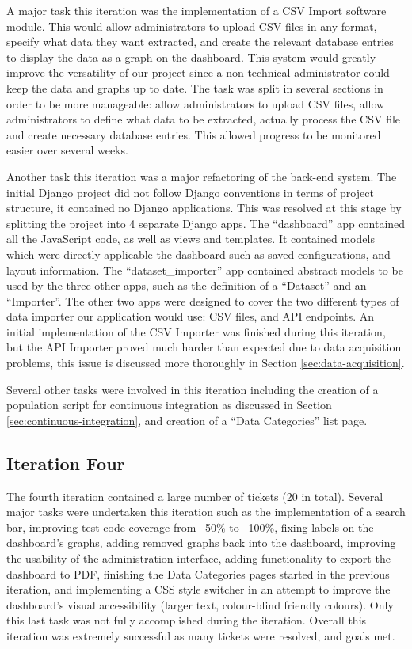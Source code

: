 \documentclass{l3proj}
\begin{document}
A major task this iteration was the implementation of a CSV Import software module. This would allow administrators to upload CSV files in any format, specify what data they want extracted, and create the relevant database entries to display the data as a graph on the dashboard. This system would greatly improve the versatility of our project since a non-technical administrator could keep the data and graphs up to date. The task was split in several sections in order to be more manageable: allow administrators to upload CSV files, allow administrators to define what data to be extracted, actually process the CSV file and create necessary database entries. This allowed progress to be monitored easier over several weeks.

Another task this iteration was a major refactoring of the back-end system. The initial Django project did not follow Django conventions in terms of project structure, it contained no Django applications. This was resolved at this stage by splitting the project into 4 separate Django apps. The ``dashboard'' app contained all the JavaScript code, as well as views and templates. It contained models which were directly applicable the dashboard such as saved configurations, and layout information. The ``dataset\_importer'' app contained abstract models to be used by the three other apps, such as the definition of a ``Dataset'' and an ``Importer''. The other two apps were designed to cover the two different types of data importer our application would use: CSV files, and API endpoints. An initial implementation of the CSV Importer was finished during this iteration, but the API Importer proved much harder than expected due to data acquisition problems, this issue is discussed more thoroughly in Section \ref{sec:data-acquisition}.

Several other tasks were involved in this iteration including the creation of a population script for continuous integration as discussed in Section \ref{sec:continuous-integration}, and creation of a ``Data Categories'' list page.

\subsection{Iteration Four}
\label{sec:development:iteration-four}

The fourth iteration contained a large number of tickets (20 in total). Several major tasks were undertaken this iteration such as the implementation of a search bar, improving test code coverage from ~50\% to ~100\%, fixing labels on the dashboard's graphs, adding removed graphs back into the dashboard, improving the usability of the administration interface, adding functionality to export the dashboard to PDF, finishing the Data Categories pages started in the previous iteration, and implementing a CSS style switcher in an attempt to improve the dashboard's visual accessibility (larger text, colour-blind friendly colours). Only this last task was not fully accomplished during the iteration. Overall this iteration was extremely successful as many tickets were resolved, and goals met.
\end{document}
